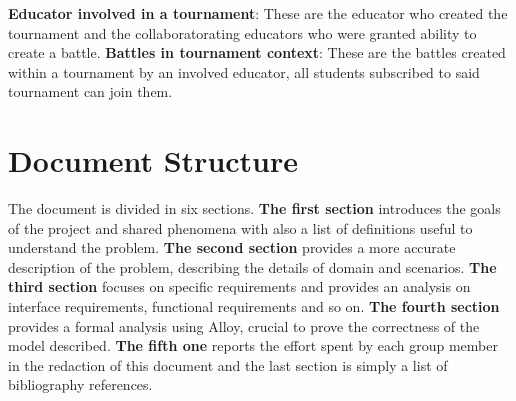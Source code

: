 \textbf{Educator involved in a tournament}: These are the educator who created the tournament and the collaboratorating educators who were granted ability to create a battle. \newline
\textbf{Battles in tournament context}: These are the battles created within a tournament by an involved educator, all students subscribed to said tournament can join them.

\section{Document Structure}
The document is divided in six sections. \newline
\textbf{The first section} introduces the goals of the project and shared phenomena with also a list of definitions useful to understand the problem.\newline
\textbf{The second section} provides a more accurate description of the problem, describing the details of domain and scenarios.\newline
\textbf{The third section} focuses on specific requirements and provides an analysis on interface requirements, functional requirements and so on.\newline
\textbf{The fourth section} provides a formal analysis using Alloy, crucial to prove the correctness of the model described.\newline
\textbf{The fifth one} reports the effort spent by each group member in the redaction of this document and the last section is simply a list of bibliography references.